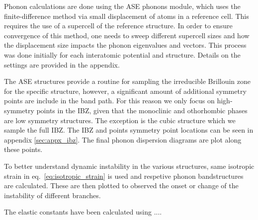 \documentclass[preprint]{elsarticle}
\begin{document}
Phonon calculations are done using the ASE phonons module, which uses the finite-difference method via small displacement of atoms in a reference cell. This requires the use of a supercell of the reference structure. In order to ensure convergence of this method, one needs to sweep different supercell sizes and how the displacement size impacts the phonon eigenvalues and vectors. This process was done initially for each interatomic potential and structure. Details on the settings are provided in the appendix. \par

The ASE structures provide a routine for sampling the irreducible Brillouin zone for the specific structure, however, a significant amount of additional symmetry points are include in the band path. For this reason we only focus on high-symmetry points in the IBZ, given that the monoclinic and othorhombic phases are low symmetry structures. The exception is the cubic structure which we sample the full IBZ. The IBZ and points symmetry point locations can be seen in appendix \ref{sec:appx_ibz}. The final phonon dispersion diagrams are plot along these points. \par

To better understand dynamic instability in the various structures, same isotropic strain in eq.~\ref{eq:isotropic_strain} is used and respetive phonon bandstructures are calculated. These are then plotted to observed the onset or change of the instability of different branches. \par

The elastic constants have been calculated using ....
\end{document}
